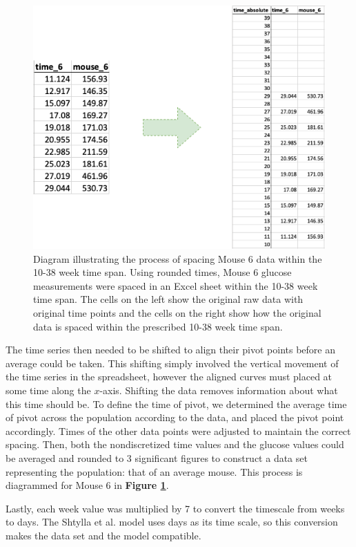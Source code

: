 \begin{figure}[H]
    \centering
    \includegraphics[width=15cm]{MCMC_figs/lietal_avg_diagram.png}
    \caption{Diagram illustrating the process of spacing Mouse 6 data within the 10-38 week time span. Using rounded times, Mouse 6 glucose measurements were spaced in an Excel sheet within the 10-38 week time span. The cells on the left show the original raw data with original time points and the cells on the right show how the original data is spaced within the prescribed 10-38 week time span.}
    \label{fig:3prob}
\end{figure}
The time series then needed to be shifted to align their pivot points before an average could be taken. This shifting simply involved the vertical movement of the time series in the spreadsheet, however the aligned curves must placed at some time along the $x$-axis. Shifting the data removes information about what this time should be. To define the time of pivot, we determined the average time of pivot across the population according to the data, and placed the pivot point accordingly. Times of the other data points were adjusted to maintain the correct spacing. Then, both the nondiscretized time values and the glucose values could be averaged and rounded to 3 significant figures to construct a data set representing the population: that of an average mouse. This process is diagrammed for Mouse 6 in \textbf{Figure \ref{fig:3prob}}. 
\par Lastly, each week value was multiplied by 7 to convert the timescale from weeks to days. The Shtylla et al. model uses days as its time scale, so this conversion makes the data set and the model compatible.
